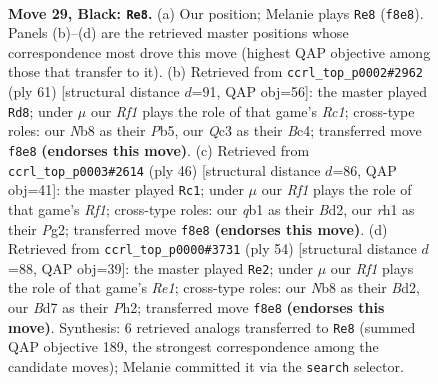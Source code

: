 \documentclass[11pt]{article}
\begin{document}
\clearpage

\begin{figure}[p]\centering
\begin{subfigure}{0.46\textwidth}\centering
\resizebox{\linewidth}{!}{%
\newchessgame
\chessboard[
  setfen={1n3rk1/3b1ppp/8/4Pp2/p4P2/2q4N/P1P2KPP/1Q3B1R b - - 1 29},
  showmover=false,
  pgfstyle=straightmove, color=movearrow, markmove={f8-e8}
]}
\caption{}
\end{subfigure}\hfill
\begin{subfigure}{0.46\textwidth}\centering
\resizebox{\linewidth}{!}{%
\newchessgame
\chessboard[
  setfen={2r3k1/5pp1/3q3p/pp1P4/2b4P/P1P3P1/1Q3PB1/4R1K1 b - - 0 31},
  showmover=false,
  pgfstyle=straightmove, color=movearrow, markmove={c8-d8}
]}
\caption{}
\end{subfigure}
\\[4pt]
\begin{subfigure}{0.46\textwidth}\centering
\resizebox{\linewidth}{!}{%
\newchessgame
\chessboard[
  setfen={r2q2k1/p4pb1/4b1pp/1PQ5/P2p4/5N2/3B1PPP/5RK1 w - - 0 24},
  showmover=false,
  pgfstyle=straightmove, color=movearrow, markmove={f1-c1}
]}
\caption{}
\end{subfigure}\hfill
\begin{subfigure}{0.46\textwidth}\centering
\resizebox{\linewidth}{!}{%
\newchessgame
\chessboard[
  setfen={2n2rk1/p4pbp/Q1Pp2p1/P1p5/4N3/8/1q1B1PPP/4R1K1 w - - 5 28},
  showmover=false,
  pgfstyle=straightmove, color=movearrow, markmove={e1-e2}
]}
\caption{}
\end{subfigure}
\caption{\textbf{Move 29, Black: \texttt{Re8}.} (a) Our position; Melanie plays \texttt{Re8} (\texttt{f8e8}). Panels (b)--(d) are the retrieved master positions whose correspondence most drove this move (highest QAP objective among those that transfer to it). (b) Retrieved from \texttt{ccrl\_top\_p0002\#2962} (ply 61) [structural distance $d$=91, QAP obj=56]: the master played \texttt{Rd8}; under $\mu$ our \emph{Rf1} plays the role of that game's \emph{Rc1}; cross-type roles: our \emph{N}b8 as their \emph{P}b5, our \emph{Q}c3 as their \emph{B}c4; transferred move \texttt{f8e8} \textbf{(endorses this move)}. (c) Retrieved from \texttt{ccrl\_top\_p0003\#2614} (ply 46) [structural distance $d$=86, QAP obj=41]: the master played \texttt{Rc1}; under $\mu$ our \emph{Rf1} plays the role of that game's \emph{Rf1}; cross-type roles: our \emph{q}b1 as their \emph{B}d2, our \emph{r}h1 as their \emph{P}g2; transferred move \texttt{f8e8} \textbf{(endorses this move)}. (d) Retrieved from \texttt{ccrl\_top\_p0000\#3731} (ply 54) [structural distance $d$=88, QAP obj=39]: the master played \texttt{Re2}; under $\mu$ our \emph{Rf1} plays the role of that game's \emph{Re1}; cross-type roles: our \emph{N}b8 as their \emph{B}d2, our \emph{B}d7 as their \emph{P}h2; transferred move \texttt{f8e8} \textbf{(endorses this move)}. Synthesis: 6 retrieved analogs transferred to \texttt{Re8} (summed QAP objective 189, the strongest correspondence among the candidate moves); Melanie committed it via the \texttt{search} selector.}
\label{fig:thought-m57}
\end{figure}
\end{document}
